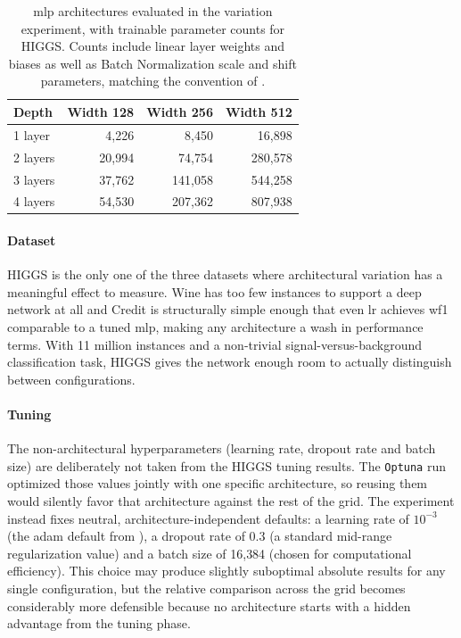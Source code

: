 \begin{table}[htbp]
\centering
\caption[\acrshort{mlp} architecture variation: configurations and parameter counts.]{\gls{mlp} architectures evaluated in the variation experiment, with trainable parameter counts for HIGGS. Counts include linear layer weights and biases as well as Batch Normalization scale and shift parameters, matching the convention of .}
\label{tab:mlp_architectures}
\begin{tabular}{lrrr}
\toprule
\textbf{Depth} & \textbf{Width 128} & \textbf{Width 256} & \textbf{Width 512} \\
\midrule
1 layer  &   4{,}226 &   8{,}450 &  16{,}898 \\
2 layers &  20{,}994 &  74{,}754 & 280{,}578 \\
3 layers &  37{,}762 & 141{,}058 & 544{,}258 \\
4 layers &  54{,}530 & 207{,}362 & 807{,}938 \\
\bottomrule
\end{tabular}
\end{table}

\paragraph{Dataset}
HIGGS is the only one of the three datasets where architectural variation has a meaningful effect to measure. Wine has too few instances to support a deep network at all and Credit is structurally simple enough that even \gls{lr} achieves \gls{wf1} comparable to a tuned \gls{mlp}, making any architecture a wash in performance terms. With 11 million instances and a non-trivial signal-versus-background classification task, HIGGS gives the network enough room to actually distinguish between configurations.

\paragraph{Tuning}
The non-architectural hyperparameters (learning rate, dropout rate and batch size) are deliberately not taken from the HIGGS tuning results. The \texttt{Optuna} run optimized those values jointly with one specific architecture, so reusing them would silently favor that architecture against the rest of the grid. The experiment instead fixes neutral, architecture-independent defaults: a learning rate of $10^{-3}$ (the \gls{adam} default from \citeauthor{kingmaAdamMethodStochastic2015} \cite{kingmaAdamMethodStochastic2015}), a dropout rate of $0.3$ (a standard mid-range regularization value) and a batch size of 16{,}384 (chosen for computational efficiency). This choice may produce slightly suboptimal absolute results for any single configuration, but the relative comparison across the grid becomes considerably more defensible because no architecture starts with a hidden advantage from the tuning phase.

